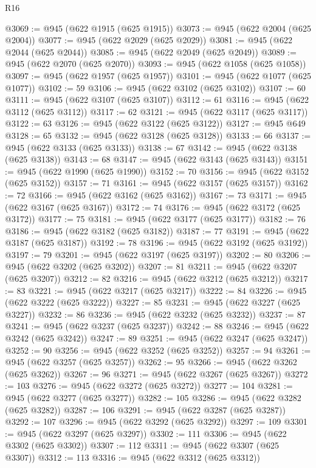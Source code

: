 \begin{lexlean}{R16}
\begin{coremodule}
@3069 := @945 (@622 @1915 (@625 @1915))
@3073 := @945 (@622 @2004 (@625 @2004))
@3077 := @945 (@622 @2029 (@625 @2029))
@3081 := @945 (@622 @2044 (@625 @2044))
@3085 := @945 (@622 @2049 (@625 @2049))
@3089 := @945 (@622 @2070 (@625 @2070))
@3093 := @945 (@622 @1058 (@625 @1058))
@3097 := @945 (@622 @1957 (@625 @1957))
@3101 := @945 (@622 @1077 (@625 @1077))
@3102 := 59
@3106 := @945 (@622 @3102 (@625 @3102))
@3107 := 60
@3111 := @945 (@622 @3107 (@625 @3107))
@3112 := 61
@3116 := @945 (@622 @3112 (@625 @3112))
@3117 := 62
@3121 := @945 (@622 @3117 (@625 @3117))
@3122 := 63
@3126 := @945 (@622 @3122 (@625 @3122))
@3127 := @945 @649
@3128 := 65
@3132 := @945 (@622 @3128 (@625 @3128))
@3133 := 66
@3137 := @945 (@622 @3133 (@625 @3133))
@3138 := 67
@3142 := @945 (@622 @3138 (@625 @3138))
@3143 := 68
@3147 := @945 (@622 @3143 (@625 @3143))
@3151 := @945 (@622 @1990 (@625 @1990))
@3152 := 70
@3156 := @945 (@622 @3152 (@625 @3152))
@3157 := 71
@3161 := @945 (@622 @3157 (@625 @3157))
@3162 := 72
@3166 := @945 (@622 @3162 (@625 @3162))
@3167 := 73
@3171 := @945 (@622 @3167 (@625 @3167))
@3172 := 74
@3176 := @945 (@622 @3172 (@625 @3172))
@3177 := 75
@3181 := @945 (@622 @3177 (@625 @3177))
@3182 := 76
@3186 := @945 (@622 @3182 (@625 @3182))
@3187 := 77
@3191 := @945 (@622 @3187 (@625 @3187))
@3192 := 78
@3196 := @945 (@622 @3192 (@625 @3192))
@3197 := 79
@3201 := @945 (@622 @3197 (@625 @3197))
@3202 := 80
@3206 := @945 (@622 @3202 (@625 @3202))
@3207 := 81
@3211 := @945 (@622 @3207 (@625 @3207))
@3212 := 82
@3216 := @945 (@622 @3212 (@625 @3212))
@3217 := 83
@3221 := @945 (@622 @3217 (@625 @3217))
@3222 := 84
@3226 := @945 (@622 @3222 (@625 @3222))
@3227 := 85
@3231 := @945 (@622 @3227 (@625 @3227))
@3232 := 86
@3236 := @945 (@622 @3232 (@625 @3232))
@3237 := 87
@3241 := @945 (@622 @3237 (@625 @3237))
@3242 := 88
@3246 := @945 (@622 @3242 (@625 @3242))
@3247 := 89
@3251 := @945 (@622 @3247 (@625 @3247))
@3252 := 90
@3256 := @945 (@622 @3252 (@625 @3252))
@3257 := 94
@3261 := @945 (@622 @3257 (@625 @3257))
@3262 := 95
@3266 := @945 (@622 @3262 (@625 @3262))
@3267 := 96
@3271 := @945 (@622 @3267 (@625 @3267))
@3272 := 103
@3276 := @945 (@622 @3272 (@625 @3272))
@3277 := 104
@3281 := @945 (@622 @3277 (@625 @3277))
@3282 := 105
@3286 := @945 (@622 @3282 (@625 @3282))
@3287 := 106
@3291 := @945 (@622 @3287 (@625 @3287))
@3292 := 107
@3296 := @945 (@622 @3292 (@625 @3292))
@3297 := 109
@3301 := @945 (@622 @3297 (@625 @3297))
@3302 := 111
@3306 := @945 (@622 @3302 (@625 @3302))
@3307 := 112
@3311 := @945 (@622 @3307 (@625 @3307))
@3312 := 113
@3316 := @945 (@622 @3312 (@625 @3312))

\end{coremodule}
\end{lexlean}
